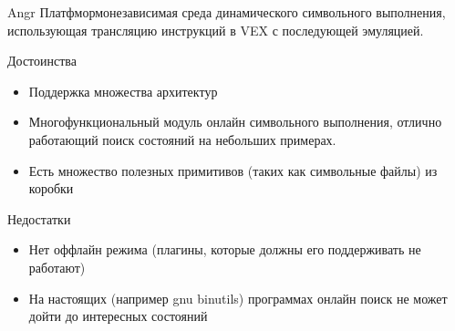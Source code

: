 \documentclass[10pt]{beamer}
\begin{document}

\begin{frame}{Angr}
    Платфмормонезависимая среда динамического символьного выполнения, использующая трансляцию инструкций в VEX с последующей эмуляцией.
    \begin{block}{Достоинства}
      \begin{itemize}
        \item Поддержка множества архитектур
        \item Многофункциональный модуль онлайн символьного выполнения, отлично работающий поиск состояний на небольших примерах.
        \item Есть множество полезных примитивов (таких как символьные файлы) из коробки
      \end{itemize}
    \end{block}
        \begin{block}{Недостатки}
          \begin{itemize}
      \item Нет оффлайн режима (плагины, которые должны его поддерживать не работают)
      \item На настоящих (например gnu binutils) программах онлайн поиск не может дойти до интересных состояний 
      \end{itemize}
    \end{block}
\end{frame}
\end{document}
